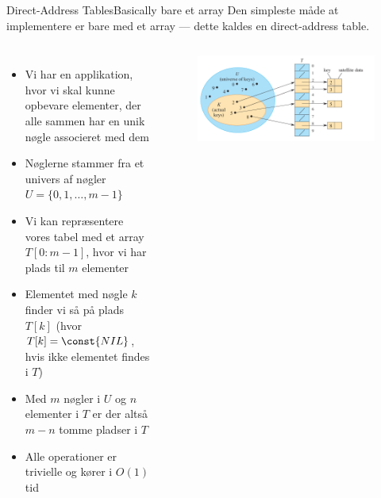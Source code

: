 \documentclass[aspectratio=1610]{beamer}
\begin{document}
\begin{frame}{Direct-Address Tables}{Basically bare et array}
    Den simpleste måde at implementere er bare med et array --- dette kaldes en
    \alert{direct-address table}.

    \begin{columns}
        \small
        \begin{itemize}[<+(1)->]
            \item Vi har en applikation, hvor vi skal kunne opbevare elementer,
                der alle sammen har en unik nøgle associeret med dem
            \item Nøglerne stammer fra et \alert{univers} af nøgler $U =
                \{0,1,\ldots,m-1\}$
            \item Vi kan repræsentere vores tabel med et array $T[0:m-1]$, hvor
                vi har plads til $m$ elementer
            \item Elementet med nøgle $k$ finder vi så på plads $T[k]$ (hvor
                $T[k] = \const{NIL}$, hvis ikke elementet findes i $T$)
            \item Med $m$ nøgler i $U$ og $n$ elementer i $T$ er der altså $m -
                n$ tomme pladser i $T$
            \item Alle operationer er trivielle og kører i $O(1)$ tid
        \end{itemize}
    
        \begin{figure}[h]
            \centering
            \includegraphics[width=\textwidth]{direct-address-table}
        \end{figure}
    \end{columns}
\end{frame}
\end{document}
